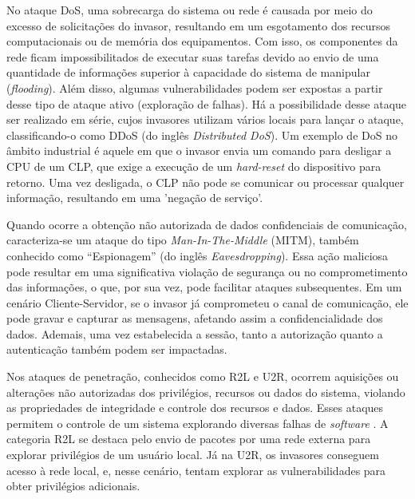         No ataque DoS, uma sobrecarga do sistema ou rede é causada por meio do excesso de solicitações do invasor, resultando em um esgotamento dos recursos computacionais ou de memória dos equipamentos. Com isso, os componentes da rede ficam impossibilitados de executar suas tarefas devido ao envio de uma quantidade de informações superior à capacidade do sistema de manipular (\textit{flooding}). Além disso, algumas vulnerabilidades podem ser expostas a partir desse tipo de ataque ativo (exploração de falhas). Há a possibilidade desse ataque ser realizado em série, cujos invasores utilizam vários locais para lançar o ataque, classificando-o como DDoS (do inglês \textit{Distributed DoS}). Um exemplo de DoS no âmbito industrial é aquele em que o invasor envia um comando para desligar a CPU de um CLP, que exige a execução de um \textit{hard-reset} do dispositivo para retorno. Uma vez desligada, o CLP não pode se comunicar ou processar qualquer informação, resultando em uma 'negação de serviço'.

        Quando ocorre a obtenção não autorizada de dados confidenciais de comunicação, caracteriza-se um ataque do tipo \textit{Man-In-The-Middle} (MITM), também conhecido como ``Espionagem'' (do inglês \textit{Eavesdropping}). Essa ação maliciosa pode resultar em uma significativa violação de segurança ou no comprometimento das informações, o que, por sua vez, pode facilitar ataques subsequentes. Em um cenário Cliente-Servidor, se o invasor já comprometeu o canal de comunicação, ele pode gravar e capturar as mensagens, afetando assim a confidencialidade dos dados. Ademais, uma vez estabelecida a sessão, tanto a autorização quanto a autenticação também podem ser impactadas.

        Nos ataques de penetração, conhecidos como R2L e U2R, ocorrem aquisições ou alterações não autorizadas dos privilégios, recursos ou dados do sistema, violando as propriedades de integridade e controle dos recursos e dados. Esses ataques permitem o controle de um sistema explorando diversas falhas de \textit{software} \cite{turcato2020}. A categoria R2L se destaca pelo envio de pacotes por uma rede externa para explorar privilégios de um usuário local. Já na U2R, os invasores conseguem acesso à rede local, e, nesse cenário, tentam explorar as vulnerabilidades para obter privilégios adicionais.



